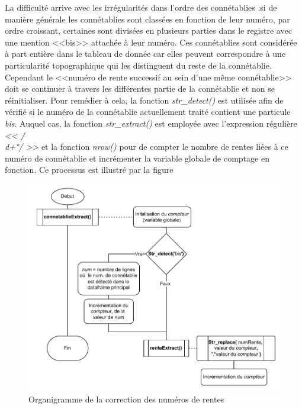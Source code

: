 La difficulté arrive avec les irrégularités dans l'ordre des connétablies :si de manière générale les connétablies sont classées en fonction de leur numéro, par ordre croissant, certaines  sont divisées en plusieurs parties dans le registre avec une mention <<bis>>  attachée  à leur numéro.  Ces connétablies sont considérée à part entière dans le tableau de donnée car elles peuvent correspondre à une particularité topographique qui les distinguent du reste de la connétablie. Cependant le <<numéro de rente successif au sein d'une même connétablie>> doit se continuer à travers les différentes partie de la connétablie  et non se réinitialiser. Pour remédier à cela, 
la fonction \textit{str\_detect()} est utilisée  afin de vérifié si le numéro de la connétablie actuellement traité contient une particule \textit{bis}. Auquel cas, la fonction \textit{str\_extract()} est employée avec l'expression régulière \textit{<< /\\d+°/  >>} et la fonction \textit{nrow()} pour de compter le nombre de rentes liées à ce numéro de connétablie et incrémenter la variable globale de comptage en  fonction. Ce processus est illustré par la figure 
\begin{figure}
    \centering
    \includegraphics{3.Results/Img/numRente_corr.drawio.pdf}
    \caption{Organigramme de la correction des numéros de rentes}
    \label{fig:my_label}
\end{figure}


